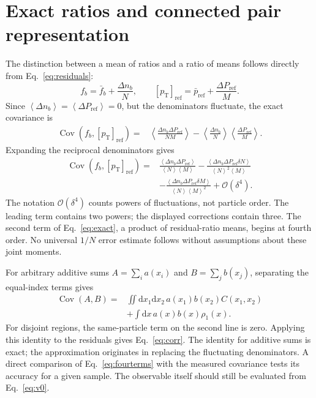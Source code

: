 \documentclass[aps,prc,twocolumn,superscriptaddress,nofootinbib,longbibliography,floatfix,10pt]{revtex4-2}
\newcommand{\mpt}{[p_{\mathrm T}]_{\mathrm{ref}}}
\newcommand{\av}[1]{\left\langle #1\right\rangle}
\newcommand{\Cov}{\operatorname{Cov}}
\newcommand{\dd}{\mathrm d}
\begin{document}
\appendix
\section{Exact ratios and connected pair representation}\label{app:derivation}
The distinction between a mean of ratios and a ratio of means follows directly from Eq.~\eqref{eq:residuals}:
\begin{equation}
 f_b=\bar f_b+\frac{\Delta n_b}{N},\qquad
 \mpt=\bar p_{\mathrm{ref}}+\frac{\Delta P_{\mathrm{ref}}}{M}.
\end{equation}
Since $\av{\Delta n_b}=\av{\Delta P_{\mathrm{ref}}}=0$, but the denominators fluctuate, the exact covariance is
\begin{align}
 \Cov(f_b,\mpt)={}&\av{\frac{\Delta n_b\Delta P_{\mathrm{ref}}}{NM}}
 -\av{\frac{\Delta n_b}{N}}\av{\frac{\Delta P_{\mathrm{ref}}}{M}}.
 \label{eq:exact}
\end{align}
Expanding the reciprocal denominators gives
\begin{align}
 \Cov(f_b,\mpt)={}&\frac{\av{\Delta n_b\Delta P_{\mathrm{ref}}}}{\av N\av M}
 -\frac{\av{\Delta n_b\Delta P_{\mathrm{ref}}\delta N}}{\av N^2\av M}\nonumber\\
 &-\frac{\av{\Delta n_b\Delta P_{\mathrm{ref}}\delta M}}{\av N\av M^2}
 +\mathcal O(\delta^4).
 \label{eq:corrections}
\end{align}
The notation $\mathcal O(\delta^4)$ counts powers of fluctuations, not particle order. The leading term contains two powers; the displayed corrections contain three. The second term of Eq.~\eqref{eq:exact}, a product of residual-ratio means, begins at fourth order. No universal $1/N$ error estimate follows without assumptions about these joint moments.

For arbitrary additive sums $A=\sum_i a(x_i)$ and $B=\sum_j b(x_j)$, separating the equal-index terms gives
\begin{align}
 \Cov(A,B)={}&\iint\dd x_1\dd x_2\,a(x_1)b(x_2)C(x_1,x_2)\nonumber\\
 &+\int\dd x\,a(x)b(x)\rho_1(x).
 \label{eq:additive}
\end{align}
For disjoint regions, the same-particle term on the second line is zero. Applying this identity to the residuals gives Eq.~\eqref{eq:corr}. The identity for additive sums is exact; the approximation originates in replacing the fluctuating denominators. A direct comparison of Eq.~\eqref{eq:fourterms} with the measured covariance tests its accuracy for a given sample. The observable itself should still be evaluated from Eq.~\eqref{eq:v0}.
\end{document}
